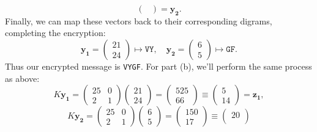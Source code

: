 \documentclass[12pt]{article}
\newenvironment{answer}
    {\begin{adjustwidth}{0pt}{0pt}}
    {\end{adjustwidth}}
\theoremstyle{remark}  %
\begin{document}
\begin{answer}
$$\begin{pmatrix}
            \end{pmatrix} = \mathbf{y_2}
            .$$ 
        Finally, we can map these vectors back to their corresponding digrams, completing the encryption: $$
            \mathbf{y_1} = \begin{pmatrix}
                21 \\
                24
            \end{pmatrix} \mapsto \texttt{VY},\quad\mathbf{y_2} = \begin{pmatrix}
                6 \\
                5
            \end{pmatrix} \mapsto \texttt{GF}.$$ Thus our encrypted message is \texttt{VYGF}. \newline
        For part (b), we'll perform the same process as above:
        $$
            K\mathbf{y_1} = \begin{pmatrix}
                25 & 0 \\
                2 & 1
            \end{pmatrix}
            \begin{pmatrix}
                21 \\
                24
            \end{pmatrix} = 
            \begin{pmatrix}
                525 \\
                66
            \end{pmatrix} \equiv
            \begin{pmatrix}
                5 \\
                14
            \end{pmatrix} = \mathbf{z_1},$$$$ K\mathbf{y_2} = 
            \begin{pmatrix}
                25 & 0 \\
                2 & 1
            \end{pmatrix}
            \begin{pmatrix}
                6 \\
                5
            \end{pmatrix} = 
            \begin{pmatrix}
                150 \\
                17
            \end{pmatrix} \equiv
            \begin{pmatrix}
                20 \\

\end{pmatrix}$$
\end{answer}
\end{document}
